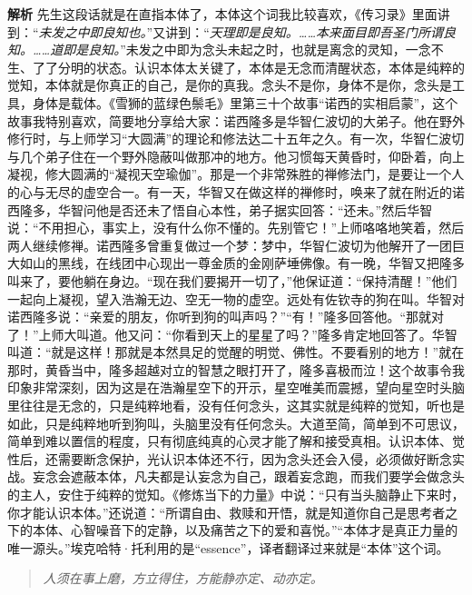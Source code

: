 \textbf{解析} 先生这段话就是在直指本体了，本体这个词我比较喜欢，《传习录》里面讲到：“\textit{未发之中即良知也。}”又讲到：“\textit{天理即是良知。……本来面目即吾圣门所谓良知。……道即是良知。}”未发之中即为念头未起之时，也就是离念的灵知，一念不生、了了分明的状态。认识本体太关键了，本体是无念而清醒状态，本体是纯粹的觉知，本体就是你真正的自己，是你的真我。念头不是你，身体不是你，念头是工具，身体是载体。《雪狮的蓝绿色鬃毛》里第三十个故事“诺西的实相启蒙”，这个故事我特别喜欢，简要地分享给大家：诺西隆多是华智仁波切的大弟子。他在野外修行时，与上师学习“大圆满”的理论和修法达二十五年之久。有一次，华智仁波切与几个弟子住在一个野外隐蔽叫做那冲的地方。他习惯每天黄昏时，仰卧着，向上凝视，修大圆满的“凝视天空瑜伽”。那是一个非常殊胜的禅修法门，是要让一个人的心与无尽的虚空合一。有一天，华智又在做这样的禅修时，唤来了就在附近的诺西隆多，华智问他是否还未了悟自心本性，弟子据实回答：“还未。”然后华智说：“不用担心，事实上，没有什么你不懂的。先别管它！”上师咯咯地笑着，然后两人继续修禅。诺西隆多曾重复做过一个梦：梦中，华智仁波切为他解开了一团巨大如山的黑线，在线团中心现出一尊金质的金刚萨埵佛像。有一晚，华智又把隆多叫来了，要他躺在身边。“现在我们要揭开一切了，”他保证道：“保持清醒！”他们一起向上凝视，望入浩瀚无边、空无一物的虚空。远处有佐钦寺的狗在叫。华智对诺西隆多说：“亲爱的朋友，你听到狗的叫声吗？”“有！”隆多回答他。“那就对了！”上师大叫道。他又问：“你看到天上的星星了吗？”隆多肯定地回答了。华智叫道：“就是这样！那就是本然具足的觉醒的明觉、佛性。不要看别的地方！”就在那时，黄昏当中，隆多超越对立的智慧之眼打开了，隆多喜极而泣！这个故事令我印象非常深刻，因为这是在浩瀚星空下的开示，星空唯美而震撼，望向星空时头脑里往往是无念的，只是纯粹地看，没有任何念头，这其实就是纯粹的觉知，听也是如此，只是纯粹地听到狗叫，头脑里没有任何念头。大道至简，简单到不可思议，简单到难以置信的程度，只有彻底纯真的心灵才能了解和接受真相。认识本体、觉性后，还需要断念保护，光认识本体还不行，因为念头还会入侵，必须做好断念实战。妄念会遮蔽本体，凡夫都是认妄念为自己，跟着妄念跑，而我们要学会做念头的主人，安住于纯粹的觉知。《修炼当下的力量》中说：“只有当头脑静止下来时，你才能认识本体。”还说道：“所谓自由、救赎和开悟，就是知道你自己是思考者之下的本体、心智噪音下的定静，以及痛苦之下的爱和喜悦。”“本体才是真正力量的唯一源头。”埃克哈特·托利用的是“essence”，译者翻译过来就是“本体”这个词。

\begin{quote}\it
    人须在事上磨，方立得住，方能静亦定、动亦定。
\end{quote}

